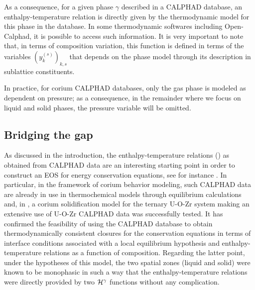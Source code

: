 As a consequence, for a given phase $\gamma$ described in a CALPHAD database, an enthalpy-temperature relation is directly given by the thermodynamic model for this phase in the database. In some thermodynamic softwares including Open-Calphad, it is possible to access such information.
It is very important to note that, in terms of composition variation, this function is defined in terms of the variables $\left(y_{k}^{(s)}\right)_{k,s}$ that depends on the phase model through its description in sublattice constituents.

In practice, for corium CALPHAD databases, only the gas phase is modeled as dependent on pressure; as a consequence, in the remainder where we focus on liquid and solid phases, the pressure variable will be omitted.

\subsection{Bridging the gap} \label{sect:gap}

As discussed in the introduction, the enthalpy-temperature relations () as obtained from CALPHAD data are an interesting starting point in order to construct an EOS for energy conservation equations, see for instance \cite{Voller2006,Du2007}. In particular, in the framework of corium behavior modeling, such CALPHAD data are already in use in thermochemical models through equilibrium calculations and, in \cite{Tiwari2018}, a corium solidification model for the ternary U-O-Zr system making an extensive use of U-O-Zr CALPHAD data was successfully tested. It has confirmed the feasibility of using the CALPHAD database to obtain thermodynamically consistent closures for the conservation equations in terms of interface conditions associated with a local equilibrium hypothesis and enthalpy-temperature relations as a function of composition. Regarding the latter point, under the hypotheses of this model, the two spatial zones (liquid and solid) were known to be monophasic in such a way that the enthalpy-temperature relations were directly provided by two ${\mathcal H}^{\gamma}$ functions without any complication.

